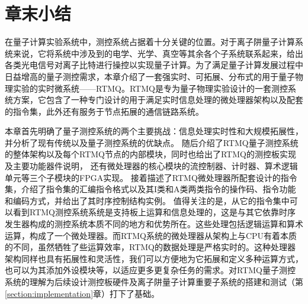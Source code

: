 




\newpage
\section[章末小结]{章末小结}

在量子计算实验系统中，测控系统占据着十分关键的位置。对于离子阱量子计算系统来说，它将系统中涉及到的电学、光学、真空等其余各个子系统联系起来，给出各类光电信号对离子比特进行操控以实现量子计算。为了满足量子计算发展过程中日益增高的量子测控需求，本章介绍了一套强实时、可拓展、分布式的用于量子物理实验的实时微系统——RTMQ。RTMQ是专为量子物理实验设计的一套测控系统方案，它包含了一种专门设计的用于满足实时信息处理的微处理器架构以及配套的指令集，此外还有服务于节点拓展的通信链路系统。

本章首先明确了量子测控系统的两个主要挑战：信息处理实时性和大规模拓展性，并分析了现有传统以及量子测控系统的优缺点。
随后介绍了RTMQ量子测控系统的整体架构以及每个RTMQ节点的内部模块，同时也给出了RTMQ的测控板实现及主要功能器件说明，
还有微处理器的核心模块的流控制器、计时器、算术逻辑单元等三个子模块的FPGA实现。
接着描述了RTMQ微处理器所配套设计的指令集，介绍了指令集的汇编指令格式以及其I类和A类两类指令的操作码、指令功能和编码方式，并给出了其时序控制结构实例。
值得关注的是，从它的指令集中可以看到RTMQ测控系统系统是支持板上运算和信息处理的，这是与其它依靠时序发生器构成的测控系统本质不同的地方和优势所在。这些处理包括逻辑运算和算术运算，构成了一个微处理器。而RTMQ系统的微处理器从架构上与CPU有着本质的不同，虽然牺牲了些运算效率，RTMQ的数据处理是严格实时的。这种处理器架构同样也具有拓展性和灵活性，我们可以方便地为它拓展和定义多种运算方式，也可以为其添加外设模块等，以适应更多更复杂任务的需求。对RTMQ量子测控系统的理解为后续设计测控板硬件及离子阱量子计算重要子系统的搭建和测试（第\ref{section:implementation}章）打下了基础。
